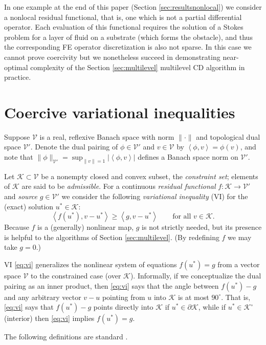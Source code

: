 \documentclass[letterpaper,final,12pt,reqno]{amsart}
\theoremstyle{cstyle}
\theoremstyle{dstyle}
\numberwithin{equation}{section}
\numberwithin{figure}{section}
\numberwithin{table}{section}
\numberwithin{theorem}{section}
\newcommand{\cK}{\mathcal{K}}
\newcommand{\cV}{\mathcal{V}}
\newcommand{\ip}[2]{\left<#1,#2\right>}
\begin{document}
In one example at the end of this paper (Section \ref{sec:resultsnonlocal}) we consider a nonlocal residual functional, that is, one which is not a partial differential operator.  Each evaluation of this functional requires the solution of a Stokes problem for a layer of fluid \nocite{SayagWorster2013} on a substrate (which forms the obstacle), and thus the corresponding FE operator discretization is also not sparse.  In this case we cannot prove coercivity but we nonetheless succeed in demonstrating near-optimal complexity of the Section \ref{sec:multilevel} multilevel CD algorithm in practice.  %


\section{Coercive variational inequalities} \label{sec:vi}

Suppose $\cV$ is a real, reflexive Banach space with norm $\|\cdot\|$ and topological dual space $\cV'$.  Denote the dual pairing of $\phi \in \cV'$ and $v\in\cV$ by $\ip{\phi}{v} = \phi(v)$, and note that $\|\phi\|_{\cV'} = \sup_{\|v\|=1} |\ip{\phi}{v}|$ defines a Banach space norm on $\cV'$.

Let $\cK \subset \cV$ be a nonempty closed and convex subset, the \emph{constraint set}; elements of $\cK$ are said to be \emph{admissible}.  For a continuous \emph{residual functional} $f:\cK \to \cV'$ and \emph{source} $g\in \cV'$ we consider the following \emph{variational inequality} (VI) for the (exact) solution $u^*\in \cK$:
\begin{equation}
\ip{f(u^*)}{v-u^*} \ge \ip{g}{v-u^*} \qquad \text{for all } v\in \cK. \label{eq:vi}
\end{equation}
Because $f$ is a (generally) nonlinear map, $g$ is not strictly needed, but its presence is helpful to the algorithms of Section \ref{sec:multilevel}.  (By redefining $f$ we may take $g=0$.)

VI \eqref{eq:vi} generalizes the nonlinear system of equations $f(u^*)=g$ from a vector space $\cV$ to the constrained case (over $\cK$).  Informally, if we conceptualize the dual pairing as an inner product, then \eqref{eq:vi} says that the angle between $f(u^*)-g$ and any arbitrary vector $v-u$ pointing from $u$ into $\cK$ is at most $90^\circ$.  That is, \eqref{eq:vi} says that $f(u^*)-g$ points directly into $\cK$ if $u^* \in\partial\cK$, while if $u^* \in \cK^\circ$ (interior) then \eqref{eq:vi} implies $f(u^*)=g$.

The following definitions are standard \cite{KinderlehrerStampacchia1980}.
\end{document}

